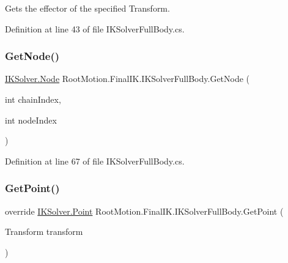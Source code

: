 Gets the effector of the specified Transform. 



Definition at line 43 of file I\+K\+Solver\+Full\+Body.\+cs.

\mbox{\label{class_root_motion_1_1_final_i_k_1_1_i_k_solver_full_body_a79ac1fc3ed2d9cba9a13f7448abfb00f}} 
\subsubsection{\texorpdfstring{Get\+Node()}{GetNode()}}
{\footnotesize\ttfamily \mbox{\hyperlink{class_root_motion_1_1_final_i_k_1_1_i_k_solver_1_1_node}{I\+K\+Solver.\+Node}} Root\+Motion.\+Final\+I\+K.\+I\+K\+Solver\+Full\+Body.\+Get\+Node (\begin{DoxyParamCaption}\item[{int}]{chain\+Index,  }\item[{int}]{node\+Index }\end{DoxyParamCaption})}



Definition at line 67 of file I\+K\+Solver\+Full\+Body.\+cs.

\mbox{\label{class_root_motion_1_1_final_i_k_1_1_i_k_solver_full_body_a7d50e5600dfb189d37780f8e74b9b5f9}} 
\subsubsection{\texorpdfstring{Get\+Point()}{GetPoint()}}
{\footnotesize\ttfamily override \mbox{\hyperlink{class_root_motion_1_1_final_i_k_1_1_i_k_solver_1_1_point}{I\+K\+Solver.\+Point}} Root\+Motion.\+Final\+I\+K.\+I\+K\+Solver\+Full\+Body.\+Get\+Point (\begin{DoxyParamCaption}\item[{Transform}]{transform }\end{DoxyParamCaption})\hspace{0.3cm}{\ttfamily [virtual]}}



